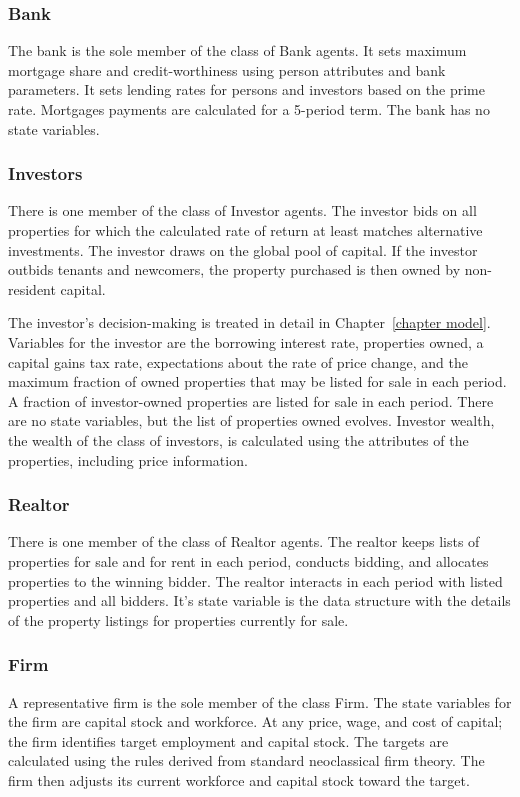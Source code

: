 \subsubsection{Bank}
The bank is the sole member of the class of Bank agents. It sets maximum mortgage share and credit-worthiness using person attributes and bank parameters. It sets lending rates for persons and investors based on the prime rate. Mortgages payments are calculated for a 5-period term. The bank has no state variables.
 
\subsubsection{Investors}
There is one member of the class of Investor agents. 
The investor bids on all properties for which the calculated rate of return at least matches alternative investments. The investor draws on the global pool of capital. If the investor outbids tenants and newcomers, the property purchased is then owned by non-resident capital.  

The investor's decision-making is treated in detail in Chapter~\ref{chapter model}. Variables for the investor are the borrowing interest rate, properties owned, a capital gains tax rate, expectations about the rate of price change, and the maximum fraction of owned properties that may be listed for sale in each period. A fraction of investor-owned properties are listed for sale in each period. There are no  state variables, but the list of properties owned evolves. Investor wealth, the wealth of the class of investors, is calculated using the attributes of the properties, including price information.


\subsubsection{Realtor}
There is one member of the class of Realtor agents. 
The realtor keeps lists of properties for sale and for rent in each period, conducts bidding, and allocates properties to the winning bidder. The realtor interacts in each period with listed properties and all bidders. It's state variable is the data structure with the details of the property listings for properties currently for sale.

\subsubsection{Firm}
A representative firm is the sole member of the class Firm. The state variables for the firm are capital stock and workforce. At any price, wage, and cost of capital; the firm identifies target employment and capital stock. The targets are calculated using the rules derived from standard neoclassical firm theory. The firm then adjusts its current workforce and capital stock toward the target. 

